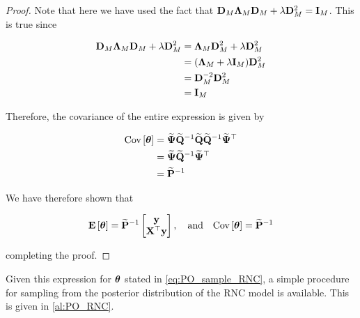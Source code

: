 \begin{proof}
Note that here we have used the fact that $\mathbf{D}_M \mathbf{\Lambda}_M \mathbf{D}_M + \lambda \mathbf{D}_M^2 = \mathbf{I}_M$. This is true since 

\begin{align*}
    \mathbf{D}_M \mathbf{\Lambda}_M \mathbf{D}_M + \lambda \mathbf{D}_M^2 &= \mathbf{\Lambda}_M \mathbf{D}_M^2 + \lambda \mathbf{D}_M^2 \\
    &= (\mathbf{\Lambda}_M + \lambda \mathbf{I}_M) \mathbf{D}_M^2 \\
    &= \mathbf{D}_M^{-2}  \mathbf{D}_M^2 \\
    &= \mathbf{I}_M
\end{align*}

Therefore, the covariance of the entire expression is given by 

\begin{align*}
    \text{Cov}\left[\boldsymbol{\theta}\right] &= \widetilde{\mathbf{\Psi}} \widetilde{\mathbf{Q}}^{-1} \widetilde{\mathbf{Q}} \widetilde{\mathbf{Q}}^{-1} \widetilde{\mathbf{\Psi}}^\top \\
    &= \widetilde{\mathbf{\Psi}} \widetilde{\mathbf{Q}}^{-1} \widetilde{\mathbf{\Psi}}^\top  \\
    &= \widetilde{\mathbf{P}}^{-1}
\end{align*}

We have therefore shown that 

$$
\mathbf{E}\left[\boldsymbol{\theta}\right] = \widetilde{\mathbf{P}}^{-1} \begin{bmatrix} \mathbf{y} \\ \mathbf{X}^\top \mathbf{y} \end{bmatrix}, \quad \text{and} \quad \text{Cov}\left[\boldsymbol{\theta}  \right] = \widetilde{\mathbf{P}}^{-1} 
$$

completing the proof. 

\end{proof}


Given this expression for $\boldsymbol{\theta}$ stated in \cref{eq:PO_sample_RNC}, a simple procedure for sampling from the posterior distribution of the RNC model is available. This is given in \cref{al:PO_RNC}. 

